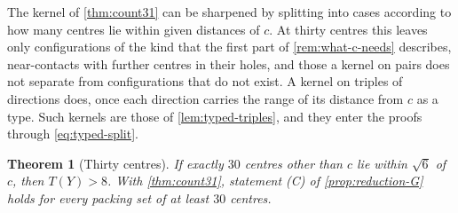 \documentclass[11pt,reqno]{amsart}
\renewcommand{\_}{\origunderscore\allowbreak}
\numberwithin{equation}{section}
\theoremstyle{plain}
\newtheorem{thm}{Theorem}[section]
\theoremstyle{definition}
\theoremstyle{remark}
\begin{document}
The kernel of \cref{thm:count31} can be sharpened by splitting into cases
according to how many centres lie within given distances of $c$. At thirty
centres this leaves only configurations of the kind that the first part of
\cref{rem:what-c-needs} describes, near-contacts with further centres in
their holes, and those a kernel on pairs does not separate from
configurations that do not exist. A kernel on triples of directions does,
once each direction carries the range of its distance from $c$ as a type.
Such kernels are those of \cref{lem:typed-triples}, and they enter the
proofs through \eqref{eq:typed-split}.

\begin{thm}[Thirty centres]\label{thm:count30}
If exactly $30$ centres other than $c$ lie within $\sqrt6$ of $c$, then
$T(Y)>8$. With \cref{thm:count31}, statement (C) of \cref{prop:reduction-G}
holds for every packing set of at least $30$ centres.
\end{thm}
\end{document}
